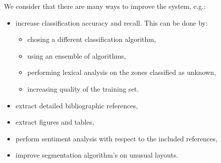 We consider that there are many ways to improve the system, e.g.:
\begin{itemize}
\item increase classification accuracy and recall. This can be done by:
	\begin{itemize}
		\item chosing a different classification algorithm,
		\item using an ensemble of algorithms,
		\item performing lexical analysis on the zones classified as unknown,
		\item increasing quality of the training set.
	\end{itemize}
\item extract detailed bibliographic references,
\item extract figures and tables,
\item perform sentiment analysis with respect to the included references,
\item improve segmentation algorithm's on unusual layouts.
\end{itemize}